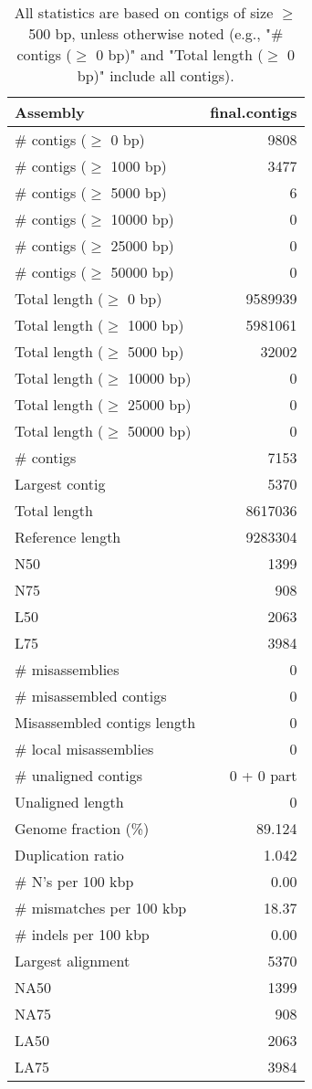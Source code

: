 \documentclass[12pt,a4paper]{article}
\begin{document}
\begin{table}[ht]
\begin{center}
\caption{All statistics are based on contigs of size $\geq$ 500 bp, unless otherwise noted (e.g., "\# contigs ($\geq$ 0 bp)" and "Total length ($\geq$ 0 bp)" include all contigs).}
\begin{tabular}{|l*{1}{|r}|}
\hline
Assembly & final.contigs \\ \hline
\# contigs ($\geq$ 0 bp) & 9808 \\ \hline
\# contigs ($\geq$ 1000 bp) & 3477 \\ \hline
\# contigs ($\geq$ 5000 bp) & 6 \\ \hline
\# contigs ($\geq$ 10000 bp) & 0 \\ \hline
\# contigs ($\geq$ 25000 bp) & 0 \\ \hline
\# contigs ($\geq$ 50000 bp) & 0 \\ \hline
Total length ($\geq$ 0 bp) & 9589939 \\ \hline
Total length ($\geq$ 1000 bp) & 5981061 \\ \hline
Total length ($\geq$ 5000 bp) & 32002 \\ \hline
Total length ($\geq$ 10000 bp) & 0 \\ \hline
Total length ($\geq$ 25000 bp) & 0 \\ \hline
Total length ($\geq$ 50000 bp) & 0 \\ \hline
\# contigs & 7153 \\ \hline
Largest contig & 5370 \\ \hline
Total length & 8617036 \\ \hline
Reference length & 9283304 \\ \hline
N50 & 1399 \\ \hline
N75 & 908 \\ \hline
L50 & 2063 \\ \hline
L75 & 3984 \\ \hline
\# misassemblies & 0 \\ \hline
\# misassembled contigs & 0 \\ \hline
Misassembled contigs length & 0 \\ \hline
\# local misassemblies & 0 \\ \hline
\# unaligned contigs & 0 + 0 part \\ \hline
Unaligned length & 0 \\ \hline
Genome fraction (\%) & 89.124 \\ \hline
Duplication ratio & 1.042 \\ \hline
\# N's per 100 kbp & 0.00 \\ \hline
\# mismatches per 100 kbp & 18.37 \\ \hline
\# indels per 100 kbp & 0.00 \\ \hline
Largest alignment & 5370 \\ \hline
NA50 & 1399 \\ \hline
NA75 & 908 \\ \hline
LA50 & 2063 \\ \hline
LA75 & 3984 \\ \hline
\end{tabular}
\end{center}
\end{table}
\end{document}
